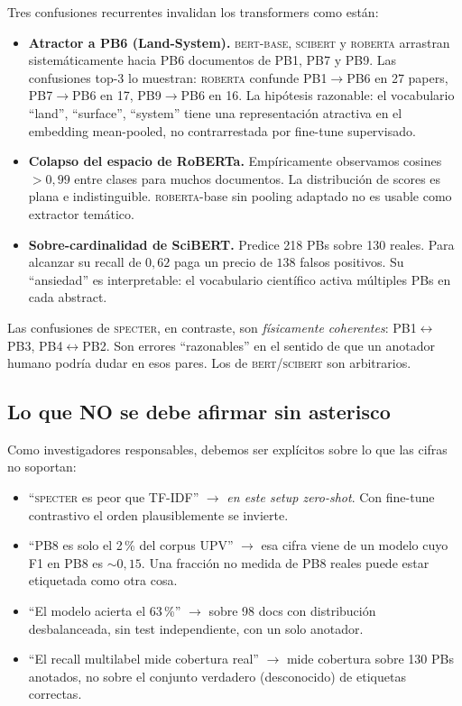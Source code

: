 \documentclass[11pt,a4paper]{article}
\begin{document}
Tres confusiones recurrentes invalidan los transformers como están:

\begin{itemize}
\item \textbf{Atractor a PB6 (Land-System).} \textsc{bert-base}, \textsc{scibert} y \textsc{roberta} arrastran sistemáticamente hacia PB6 documentos de PB1, PB7 y PB9. Las confusiones top-3 lo muestran: \textsc{roberta} confunde PB1$\to$PB6 en 27 papers, PB7$\to$PB6 en 17, PB9$\to$PB6 en 16. La hipótesis razonable: el vocabulario ``land'', ``surface'', ``system'' tiene una representación atractiva en el embedding mean-pooled, no contrarrestada por fine-tune supervisado.
\item \textbf{Colapso del espacio de RoBERTa.} Empíricamente observamos cosines $>0{,}99$ entre clases para muchos documentos. La distribución de scores es plana e indistinguible. \textsc{roberta}-base sin pooling adaptado no es usable como extractor temático.
\item \textbf{Sobre-cardinalidad de SciBERT.} Predice 218 PBs sobre 130 reales. Para alcanzar su recall de $0{,}62$ paga un precio de $138$ falsos positivos. Su ``ansiedad'' es interpretable: el vocabulario científico activa múltiples PBs en cada abstract.
\end{itemize}

Las confusiones de \textsc{specter}, en contraste, son \emph{físicamente coherentes}: PB1$\leftrightarrow$PB3, PB4$\leftrightarrow$PB2. Son errores ``razonables'' en el sentido de que un anotador humano podría dudar en esos pares. Los de \textsc{bert}/\textsc{scibert} son arbitrarios.

\subsection{Lo que NO se debe afirmar sin asterisco}

Como investigadores responsables, debemos ser explícitos sobre lo que las cifras no soportan:

\begin{itemize}
\item ``\textsc{specter} es peor que TF-IDF'' $\to$ \emph{en este setup zero-shot}. Con fine-tune contrastivo el orden plausiblemente se invierte.
\item ``PB8 es solo el 2\,\% del corpus UPV'' $\to$ esa cifra viene de un modelo cuyo F1 en PB8 es $\sim 0{,}15$. Una fracción no medida de PB8 reales puede estar etiquetada como otra cosa.
\item ``El modelo acierta el 63\,\%'' $\to$ sobre 98 docs con distribución desbalanceada, sin test independiente, con un solo anotador.
\item ``El recall multilabel mide cobertura real'' $\to$ mide cobertura sobre 130 PBs anotados, no sobre el conjunto verdadero (desconocido) de etiquetas correctas.
\end{itemize}
\end{document}
